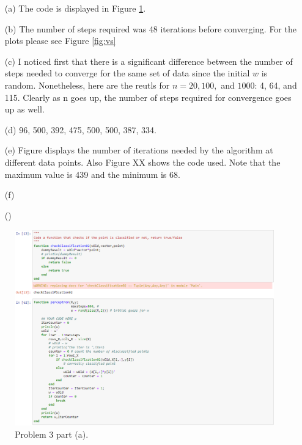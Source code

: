 \documentclass[12pt]{article}
\begin{document}
\vspace{0.2 in}
\begin{itemize}
    \item[(a)] The code is displayed in Figure \ref{fig:perCode}.
    \item[(b)] The number of steps required was 48 iterations before converging. For the plots please see Figure \ref{fig:vs}
    \item[(c)] I noticed first that there is a significant difference between the number of steps needed to converge for the same set of data since the initial $w$ is random. Nonetheless, here are the reutls for $n= 20,100,$ and $1000$: 4, 64, and 115. Clearly as n goes up, the number of steps required for convergence goes up as well.
    \item[(d)] 96, 500, 392, 475, 500, 500, 387, 334.
    \item[(e)] Figure displays the number of iterations needed by the algorithm at different data points. Also Figure XX shows the code used. Note that the maximum value is 439 and the minimum is 68.
    \item[(f)]
    \item[()]
\end{itemize}


\begin{figure}[H]
\centering
    \includegraphics[width=450 pt]{perAlgo.png}
    \caption{Problem 3 part (a).}
    \label{fig:perCode}
\end{figure}
\end{document}
